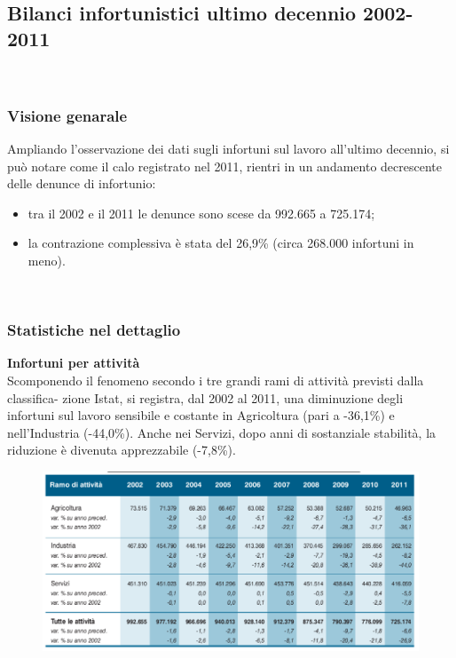 \ \ \
\subsection{Bilanci infortunistici ultimo decennio 2002-2011}
\ \
\subsubsection{Visione genarale}

Ampliando l'osservazione dei dati sugli infortuni sul lavoro all'ultimo decennio, si può notare come il calo registrato nel 2011, rientri in un andamento decrescente delle denunce di infortunio:
\begin{itemize}
\item tra il 2002 e il 2011 le denunce sono scese da 992.665 a 725.174;
\item la contrazione complessiva è stata del 26,9\% (circa 268.000 infortuni in meno).
\end{itemize}



\ \
\subsubsection{Statistiche nel dettaglio}

\textbf{Infortuni per attività}\\
Scomponendo il fenomeno secondo i tre grandi rami di attività previsti dalla classifica-
zione Istat, si registra, dal 2002 al 2011, una diminuzione degli infortuni sul lavoro sensibile e costante in Agricoltura (pari a -36,1\%) e nell’Industria (-44,0\%). Anche nei
Servizi, dopo anni di sostanziale stabilità, la riduzione è divenuta apprezzabile (-7,8\%).



\begin{figure}[H]
\centering
\includegraphics[scale=0.5]{images/analisiDiMercato/infortuniDecennioPerGestione1}
\end{figure}

